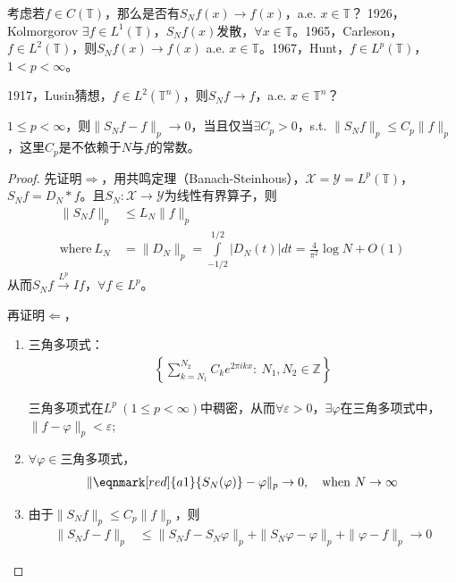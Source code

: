 考虑若$f\in C(\mathbb{T})$，那么是否有$S_N f(x)\to f(x)$，a.e. $x\in\mathbb{T}$？ 1926，Kolmorgorov $\exists f\in L^1(\mathbb{T})$，$S_N f(x)$发散，$\forall x\in\mathbb{T}$。1965，Carleson，$f\in L^2(\mathbb{T})$，则$S_N f(x)\to f(x)$ a.e. $x\in\mathbb{T}$。1967，Hunt，$f\in L^p(\mathbb{T})$，$1<p<\infty$。

1917，Lusin猜想，$f\in L^2(\mathbb{T}^n)$，则$S_N f\to f$，a.e. $x\in\mathbb{T}^n$？

\begin{lemma}
    $1\leqslant p<\infty$，则$\|S_N f - f\|_p\to 0$，当且仅当$\exists C_p > 0$，s.t. $\|S_N f\|_p \leqslant C_p\|f\|_p$，这里$C_p$是不依赖于$N$与$f$的常数。
\end{lemma}                                                                \begin{proof}
    先证明$\Longrightarrow$，用共鸣定理（Banach-Steinhous），$\mathscr{X} = \mathscr{Y} = L^p(\mathbb{T})$，$S_N f = D_N * f$。且$S_N:\mathscr{X}\to\mathscr{Y}$为线性有界算子，则
    \begin{align*}
        \|S_N f\|_p &\leqslant L_N \|f\|_p \\
        \text{where}\ L_N &= \|D_N\|_p = \int\limits_{-1/2}^{1/2} |D_N(t)| dt = \frac{4}{\pi^2} \log N + O(1)
    \end{align*}
    从而$S_N f\overset{L^p}{\to} If$，$\forall f\in L^p$。

    再证明$\Longleftarrow$，
    \begin{enumerate}[leftmargin=1cm, label=\arabic*]
        \item 三角多项式：
        \begin{align*}
            \left\lbrace \sum\limits_{k=N_1}^{N_2} C_k e^{2\pi ikx}:\ N_1,N_2\in\mathbb{Z}\right\rbrace
        \end{align*}    

        三角多项式在$L^p\ (1\leqslant p<\infty)$中稠密，从而$\forall\varepsilon>0$，$\exists \varphi$在三角多项式中，$\|f-\varphi\|_p<\varepsilon$;

        \item $\forall\varphi\in$三角多项式，
        \begin{align*}
            \|\eqnmark[red]{a1}{S_N(\varphi)} - \varphi\|_p \to 0,\quad \text{when}\ N\to\infty
        \end{align*}

        \item 由于$\|S_Nf\|_p \leqslant C_p\|f\|_p$，则
        \begin{align*}
            \|S_N f - f\|_p &\leqslant \|S_N f - S_N \varphi\|_p + \| S_N\varphi - \varphi\|_p + \|\varphi - f\|_p \to 0
        \end{align*}
    \end{enumerate}
\end{proof}

